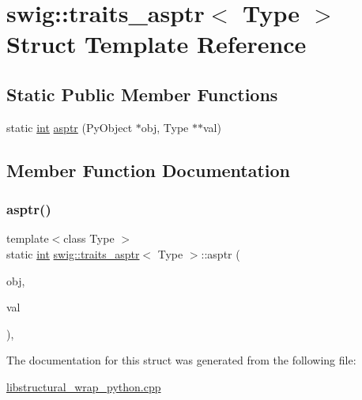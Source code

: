 \hypertarget{structswig_1_1traits__asptr}{}\section{swig\+:\+:traits\+\_\+asptr$<$ Type $>$ Struct Template Reference}
\label{structswig_1_1traits__asptr}
\subsection*{Static Public Member Functions}
\begin{DoxyCompactItemize}
\item 
static \hyperlink{lp__lib_8h_adeb9ec6400320e4923ac9d836d509ddb}{int} \hyperlink{structswig_1_1traits__asptr_aa24007f1d4126e9a4162bce7bf231931}{asptr} (Py\+Object $\ast$obj, Type $\ast$$\ast$val)
\end{DoxyCompactItemize}


\subsection{Member Function Documentation}
\mbox{\label{structswig_1_1traits__asptr_aa24007f1d4126e9a4162bce7bf231931}} 
\subsubsection{\texorpdfstring{asptr()}{asptr()}}
{\footnotesize\ttfamily template$<$class Type $>$ \\
static \hyperlink{lp__lib_8h_adeb9ec6400320e4923ac9d836d509ddb}{int} \hyperlink{structswig_1_1traits__asptr}{swig\+::traits\+\_\+asptr}$<$ Type $>$\+::asptr (\begin{DoxyParamCaption}\item[{Py\+Object $\ast$}]{obj,  }\item[{Type $\ast$$\ast$}]{val }\end{DoxyParamCaption})\hspace{0.3cm}{\ttfamily [inline]}, {\ttfamily [static]}}



The documentation for this struct was generated from the following file\+:\begin{DoxyCompactItemize}
\item 
\hyperlink{libstructural__wrap__python_8cpp}{libstructural\+\_\+wrap\+\_\+python.\+cpp}\end{DoxyCompactItemize}
